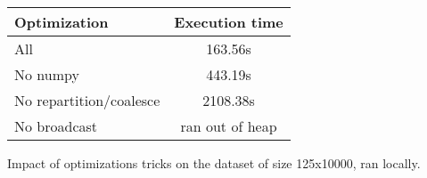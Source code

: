 \begin{tabular}{l c}
    \toprule
    \textbf{Optimization} & \textbf{Execution time} \\
    \midrule
    All            & 163.56s    \\
    No numpy       & 443.19s    \\
    No repartition/coalesce  & 2108.38s     \\
    No broadcast   & ran out of heap    \\ 
    \bottomrule
\end{tabular}
\makeatletter{}\makeatother%
\caption{Impact of optimizations tricks on the dataset of size 125x10000, ran locally.}
\label{tab:q2_optimisations}